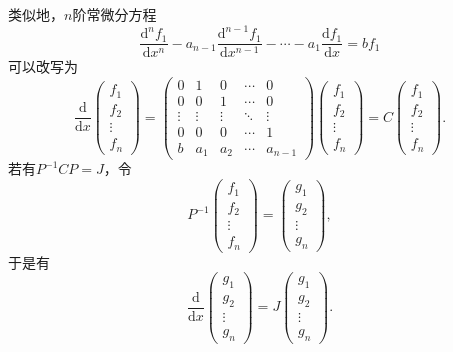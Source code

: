 类似地，$n$阶常微分方程
\[\dfrac{\mathrm{d}^nf_1}{\mathrm{d}x^n}-a_{n-1}\dfrac{\mathrm{d}^{n-1}f_1}{\mathrm{d}x^{n-1}}-\cdots-a_1\dfrac{\mathrm{d}f_1}{\mathrm{d}x}=bf_1\]
可以改写为
\[\dfrac{\mathrm{d}}{\mathrm{d}x}\begin{pmatrix}
        f_1 \\ f_2 \\ \vdots \\ f_n
    \end{pmatrix}=\begin{pmatrix}
        0      & 1      & 0      & \cdots & 0       \\
        0      & 0      & 1      & \cdots & 0       \\
        \vdots & \vdots & \vdots & \ddots & \vdots  \\
        0      & 0      & 0      & \cdots & 1       \\
        b      & a_1    & a_2    & \cdots & a_{n-1}
    \end{pmatrix}\begin{pmatrix}
        f_1 \\ f_2 \\ \vdots \\ f_n
    \end{pmatrix}=C\begin{pmatrix}
        f_1 \\ f_2 \\ \vdots \\ f_n
    \end{pmatrix}.\]
若有$P^{-1}CP=J$，令
\[P^{-1}\begin{pmatrix}
        f_1 \\ f_2 \\ \vdots \\ f_n
    \end{pmatrix}=\begin{pmatrix}
        g_1 \\ g_2 \\ \vdots \\ g_n
    \end{pmatrix},\]
于是有
\[\dfrac{\mathrm{d}}{\mathrm{d}x}\begin{pmatrix}
        g_1 \\ g_2 \\ \vdots \\ g_n
    \end{pmatrix}=J\begin{pmatrix}
        g_1 \\ g_2 \\ \vdots \\ g_n
    \end{pmatrix}.\]

